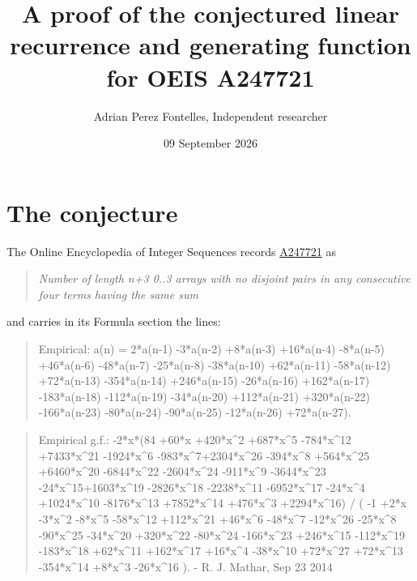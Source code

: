 \documentclass[11pt]{article}
\title{A proof of the conjectured linear recurrence and generating function for OEIS A247721}
\author{Adrian Perez Fontelles, Independent researcher}
\date{09 September 2026}
\theoremstyle{definition}
\begin{document}
\maketitle
\section{The conjecture}

The Online Encyclopedia of Integer Sequences records \href{https://oeis.org/A247721}{A247721} as

\begin{quote}\itshape Number of length n+3 0..3 arrays with no disjoint pairs in any consecutive four terms having the same sum\end{quote}

and carries in its Formula section the lines:

\begin{quote}\ttfamily Empirical: a(n) = 2*a(n-1) -3*a(n-2) +8*a(n-3) +16*a(n-4) -8*a(n-5) +46*a(n-6) -48*a(n-7) -25*a(n-8) -38*a(n-10) +62*a(n-11) -58*a(n-12) +72*a(n-13) -354*a(n-14) +246*a(n-15) -26*a(n-16) +162*a(n-17) -183*a(n-18) -112*a(n-19) -34*a(n-20) +112*a(n-21) +320*a(n-22) -166*a(n-23) -80*a(n-24) -90*a(n-25) -12*a(n-26) +72*a(n-27).\end{quote}

\begin{quote}\ttfamily Empirical g.f.: -2*x*(84 +60*x +420*x\textasciicircum{}2 +687*x\textasciicircum{}5 -784*x\textasciicircum{}12 +7433*x\textasciicircum{}21 -1924*x\textasciicircum{}6 -983*x\textasciicircum{}7+2304*x\textasciicircum{}26 -394*x\textasciicircum{}8 +564*x\textasciicircum{}25 +6460*x\textasciicircum{}20 -6844*x\textasciicircum{}22 -2604*x\textasciicircum{}24 -911*x\textasciicircum{}9 -3644*x\textasciicircum{}23 -24*x\textasciicircum{}15+1603*x\textasciicircum{}19 -2826*x\textasciicircum{}18 -2238*x\textasciicircum{}11 -6952*x\textasciicircum{}17 -24*x\textasciicircum{}4 +1024*x\textasciicircum{}10 -8176*x\textasciicircum{}13 +7852*x\textasciicircum{}14 +476*x\textasciicircum{}3 +2294*x\textasciicircum{}16) / ( -1 +2*x -3*x\textasciicircum{}2 -8*x\textasciicircum{}5 -58*x\textasciicircum{}12 +112*x\textasciicircum{}21 +46*x\textasciicircum{}6 -48*x\textasciicircum{}7 -12*x\textasciicircum{}26 -25*x\textasciicircum{}8 -90*x\textasciicircum{}25 -34*x\textasciicircum{}20 +320*x\textasciicircum{}22 -80*x\textasciicircum{}24 -166*x\textasciicircum{}23 +246*x\textasciicircum{}15 -112*x\textasciicircum{}19 -183*x\textasciicircum{}18 +62*x\textasciicircum{}11 +162*x\textasciicircum{}17 +16*x\textasciicircum{}4 -38*x\textasciicircum{}10 +72*x\textasciicircum{}27 +72*x\textasciicircum{}13 -354*x\textasciicircum{}14 +8*x\textasciicircum{}3 -26*x\textasciicircum{}16 ). - R. J. Mathar, Sep 23 2014\end{quote}
\end{document}
